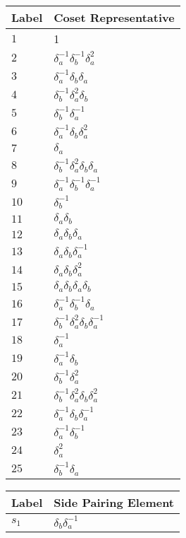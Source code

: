 \documentclass{article}
\begin{document}

\begin{center}
\begin{tabular}{ll}
\toprule
Label & Coset Representative\\
\midrule
$1$ & 1 \\
$2$ & $\delta_a^{-1}\delta_b^{-1}\delta_a^{2}$ \\
$3$ & $\delta_a^{-1}\delta_b^{}\delta_a^{}$ \\
$4$ & $\delta_b^{-1}\delta_a^{2}\delta_b^{}$ \\
$5$ & $\delta_b^{-1}\delta_a^{-1}$ \\
$6$ & $\delta_a^{-1}\delta_b^{}\delta_a^{2}$ \\
$7$ & $\delta_a^{}$ \\
$8$ & $\delta_b^{-1}\delta_a^{2}\delta_b^{}\delta_a^{}$ \\
$9$ & $\delta_a^{-1}\delta_b^{-1}\delta_a^{-1}$ \\
$10$ & $\delta_b^{-1}$ \\
$11$ & $\delta_a^{}\delta_b^{}$ \\
$12$ & $\delta_a^{}\delta_b^{}\delta_a^{}$ \\
$13$ & $\delta_a^{}\delta_b^{}\delta_a^{-1}$ \\
$14$ & $\delta_a^{}\delta_b^{}\delta_a^{2}$ \\
$15$ & $\delta_a^{}\delta_b^{}\delta_a^{}\delta_b^{}$ \\
$16$ & $\delta_a^{-1}\delta_b^{-1}\delta_a^{}$ \\
$17$ & $\delta_b^{-1}\delta_a^{2}\delta_b^{}\delta_a^{-1}$ \\
$18$ & $\delta_a^{-1}$ \\
$19$ & $\delta_a^{-1}\delta_b^{}$ \\
$20$ & $\delta_b^{-1}\delta_a^{2}$ \\
$21$ & $\delta_b^{-1}\delta_a^{2}\delta_b^{}\delta_a^{2}$ \\
$22$ & $\delta_a^{-1}\delta_b^{}\delta_a^{-1}$ \\
$23$ & $\delta_a^{-1}\delta_b^{-1}$ \\
$24$ & $\delta_a^{2}$ \\
$25$ & $\delta_b^{-1}\delta_a^{}$ \\
\bottomrule
\end{tabular}
\hfill
\begin{tabular}{ll}
\toprule
Label & Side Pairing Element\\
\midrule
$s_{1}$ & $\delta_b^{}\delta_a^{-1}$ \\

\end{tabular}
\end{center}
\end{document}
